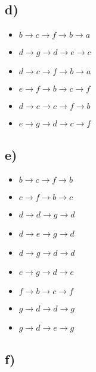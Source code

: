 \documentclass[11pt]{article}
\begin{document}
\subsection*{d)}
    
    \begin{itemize}
        \item $b \rightarrow c \rightarrow f \rightarrow b \rightarrow a$
        \item $d \rightarrow g \rightarrow d \rightarrow e \rightarrow c$
        \item $d \rightarrow c \rightarrow f \rightarrow b \rightarrow a$
        \item $e \rightarrow f \rightarrow b \rightarrow c \rightarrow f$
        \item $d \rightarrow e \rightarrow c \rightarrow f \rightarrow b$
        \item $e \rightarrow g \rightarrow d \rightarrow c \rightarrow f$
    \end{itemize}{}

\pagebreak

\subsection*{e)}

    \begin{itemize}
        \item $b \rightarrow c \rightarrow f \rightarrow b$
        \item $c \rightarrow f \rightarrow b \rightarrow c$
        \item $d \rightarrow d \rightarrow g \rightarrow d$
        \item $d \rightarrow e \rightarrow g \rightarrow d$
        \item $d \rightarrow g \rightarrow d \rightarrow d$
        \item $e \rightarrow g \rightarrow d \rightarrow e$
        \item $f \rightarrow b \rightarrow c \rightarrow f$
        \item $g \rightarrow d \rightarrow d \rightarrow g$
        \item $g \rightarrow d \rightarrow e \rightarrow g$
    \end{itemize}{}

\subsection*{f)}
    
\end{document}
